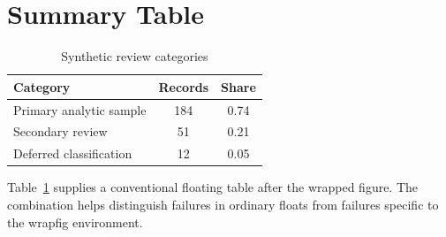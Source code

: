 \documentclass[11pt]{article}
\begin{document}
\section{Summary Table}
\label{sec:summary}

\begin{table}[htbp]
\centering
\caption{Synthetic review categories}
\label{tab:categories}
\begin{tabular}{lcc}
\toprule
Category & Records & Share \\
\midrule
Primary analytic sample & 184 & 0.74 \\
Secondary review & 51 & 0.21 \\
Deferred classification & 12 & 0.05 \\
\bottomrule
\end{tabular}
\end{table}

Table~\ref{tab:categories} supplies a conventional floating table after the
wrapped figure. The combination helps distinguish failures in ordinary floats
from failures specific to the wrapfig environment.
\end{document}
